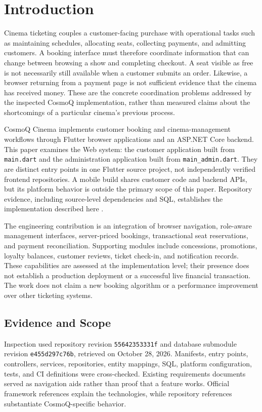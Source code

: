\documentclass[conference]{IEEEtran}
\newcommand{\code}[1]{\texttt{#1}}
\begin{document}
\section{Introduction}
Cinema ticketing couples a customer-facing purchase with operational tasks such
as maintaining schedules, allocating seats, collecting payments, and admitting
customers. A booking interface must therefore coordinate information that can
change between browsing a show and completing checkout. A seat visible as free
is not necessarily still available when a customer submits an order. Likewise,
a browser returning from a payment page is not sufficient evidence that the
cinema has received money. These are the concrete coordination problems
addressed by the inspected CosmoQ implementation, rather than measured claims
about the shortcomings of a particular cinema's previous process.

CosmoQ Cinema implements customer booking and cinema-management workflows
through Flutter browser applications and an ASP.NET Core backend. This paper
examines the Web system: the customer application built from \code{main.dart}
and the administration application built from \code{main\_admin.dart}. They are
distinct entry points in one Flutter source project, not independently verified
frontend repositories. A mobile build shares customer code and backend APIs,
but its platform behavior is outside the primary scope of this paper.
Repository evidence, including source-level dependencies and SQL, establishes
the implementation described here \cite{client,webui,deployment,db}.

The engineering contribution is an integration of browser navigation, role-aware
management interfaces, server-priced bookings, transactional seat reservations,
and payment reconciliation. Supporting modules include concessions, promotions,
loyalty balances, customer reviews, ticket check-in, and notification records.
These capabilities are assessed at the implementation level; their presence does
not establish a production deployment or a successful live financial transaction.
The work does not claim a new booking algorithm or a performance improvement over
other ticketing systems.

\subsection{Evidence and Scope}
Inspection used repository revision \code{55642353331f} and database submodule
revision \code{e455d297c76b}, retrieved on October 28, 2026. Manifests,
entry points, controllers, services, repositories, entity mappings, SQL,
platform configuration, tests, and CI definitions were cross-checked. Existing
requirements documents served as navigation aids rather than proof that a
feature works. Official framework references explain the technologies, while
repository references substantiate CosmoQ-specific behavior.
\end{document}
